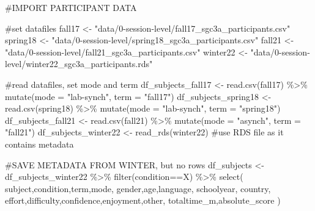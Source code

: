 \documentclass[
  letterpaper,
  DIV=11,
  numbers=noendperiod]{scrreprt}
\newenvironment{Shaded}{\begin{snugshade}}{\end{snugshade}}
\newcommand{\AttributeTok}[1]{\textcolor[rgb]{0.40,0.45,0.13}{#1}}
\newcommand{\CommentTok}[1]{\textcolor[rgb]{0.37,0.37,0.37}{#1}}
\newcommand{\FunctionTok}[1]{\textcolor[rgb]{0.28,0.35,0.67}{#1}}
\newcommand{\NormalTok}[1]{\textcolor[rgb]{0.00,0.23,0.31}{#1}}
\newcommand{\OtherTok}[1]{\textcolor[rgb]{0.00,0.23,0.31}{#1}}
\newcommand{\SpecialCharTok}[1]{\textcolor[rgb]{0.37,0.37,0.37}{#1}}
\newcommand{\StringTok}[1]{\textcolor[rgb]{0.13,0.47,0.30}{#1}}
\begin{document}
\begin{Shaded}
\begin{Highlighting}[]
\CommentTok{\#IMPORT PARTICIPANT DATA}

\CommentTok{\#set datafiles}
\NormalTok{fall17 }\OtherTok{\textless{}{-}} \StringTok{"data/0{-}session{-}level/fall17\_sgc3a\_participants.csv"}
\NormalTok{spring18 }\OtherTok{\textless{}{-}} \StringTok{"data/0{-}session{-}level/spring18\_sgc3a\_participants.csv"}
\NormalTok{fall21 }\OtherTok{\textless{}{-}} \StringTok{"data/0{-}session{-}level/fall21\_sgc3a\_participants.csv"}
\NormalTok{winter22 }\OtherTok{\textless{}{-}} \StringTok{"data/0{-}session{-}level/winter22\_sgc3a\_participants.rds"}

\CommentTok{\#read datafiles, set mode and term}
\NormalTok{df\_subjects\_fall17 }\OtherTok{\textless{}{-}} \FunctionTok{read.csv}\NormalTok{(fall17) }\SpecialCharTok{\%\textgreater{}\%} \FunctionTok{mutate}\NormalTok{(}\AttributeTok{mode =} \StringTok{"lab{-}synch"}\NormalTok{, }\AttributeTok{term =} \StringTok{"fall17"}\NormalTok{)}
\NormalTok{df\_subjects\_spring18 }\OtherTok{\textless{}{-}} \FunctionTok{read.csv}\NormalTok{(spring18) }\SpecialCharTok{\%\textgreater{}\%} \FunctionTok{mutate}\NormalTok{(}\AttributeTok{mode =} \StringTok{"lab{-}synch"}\NormalTok{, }\AttributeTok{term =} \StringTok{"spring18"}\NormalTok{)}
\NormalTok{df\_subjects\_fall21 }\OtherTok{\textless{}{-}} \FunctionTok{read.csv}\NormalTok{(fall21) }\SpecialCharTok{\%\textgreater{}\%} \FunctionTok{mutate}\NormalTok{(}\AttributeTok{mode =} \StringTok{"asynch"}\NormalTok{, }\AttributeTok{term =} \StringTok{"fall21"}\NormalTok{)}
\NormalTok{df\_subjects\_winter22 }\OtherTok{\textless{}{-}} \FunctionTok{read\_rds}\NormalTok{(winter22) }\CommentTok{\#use RDS file as it contains metadata}

\CommentTok{\#SAVE METADATA FROM WINTER, but no rows }
\NormalTok{df\_subjects }\OtherTok{\textless{}{-}}\NormalTok{ df\_subjects\_winter22 }\SpecialCharTok{\%\textgreater{}\%} \FunctionTok{filter}\NormalTok{(condition}\SpecialCharTok{==}\StringTok{\textquotesingle{}X\textquotesingle{}}\NormalTok{) }\SpecialCharTok{\%\textgreater{}\%} \FunctionTok{select}\NormalTok{(}
\NormalTok{  subject,condition,term,mode,}
\NormalTok{  gender,age,language, schoolyear, country,}
\NormalTok{  effort,difficulty,confidence,enjoyment,other,}
\NormalTok{  totaltime\_m,absolute\_score}
\NormalTok{)}


\end{Highlighting}
\end{Shaded}
\end{document}
